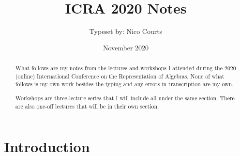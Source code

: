 \documentclass[12pt]{article}
\title{ICRA 2020 Notes}
\author{Typeset by: Nico Courts}
\date{November 2020}
\begin{document}
\maketitle
\begin{abstract}
    What follows are my notes from the lectures and workshops I attended during the 2020 (online) International Conference on the Representation of Algebras. None of what follows is my own work besides the typing and any errors in transcription are my own.
    
    Workshops are three-lecture series that I will include all under the same section. There are also one-off lectures that will be in their own section.
\end{abstract}
\section{Introduction}
\end{document}
